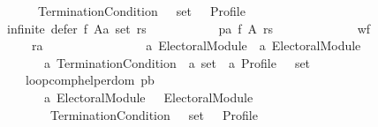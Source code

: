 \begin{isabellebody}
\ \ \ \ \ \ \ \ \ \ \ \ \ \ {\isacharparenleft}{\kern0pt}{\isacharunderscore}{\kern0pt}\ Termination{\isacharunderscore}{\kern0pt}Condition{\isacharparenright}{\kern0pt}\ {\isasymtimes}\ {\isacharunderscore}{\kern0pt}\ set\ {\isasymtimes}\ {\isacharunderscore}{\kern0pt}\ Profile{\isacharparenright}{\kern0pt}\ {\isasymor}\isanewline
\ \ \ \ \ \ \ \ \ \ infinite\ {\isacharparenleft}{\kern0pt}defer\ f\ {\isacharparenleft}{\kern0pt}A{\isacharcolon}{\kern0pt}{\isacharcolon}{\kern0pt}{\isacharprime}{\kern0pt}a\ set{\isacharparenright}{\kern0pt}\ rs{\isacharparenright}{\kern0pt}\ {\isasymor}\isanewline
\ \ \ \ \ \ \ \ \ \ pa\ {\isacharparenleft}{\kern0pt}f\ A\ rs{\isacharparenright}{\kern0pt}\ {\isasymand}\isanewline
\ \ \ \ \ \ \ \ \ \ \ \ wf\isanewline
\ \ \ \ \ \ \ \ \ \ \ \ \ \ {\isacharparenleft}{\kern0pt}ra{\isacharcolon}{\kern0pt}{\isacharcolon}{\kern0pt}{\isacharparenleft}{\kern0pt}{\isacharparenleft}{\kern0pt}\isanewline
\ \ \ \ \ \ \ \ \ \ \ \ \ \ \ \ {\isacharparenleft}{\kern0pt}{\isacharprime}{\kern0pt}a\ Electoral{\isacharunderscore}{\kern0pt}Module{\isacharparenright}{\kern0pt}\ {\isasymtimes}\ {\isacharparenleft}{\kern0pt}{\isacharprime}{\kern0pt}a\ Electoral{\isacharunderscore}{\kern0pt}Module{\isacharparenright}{\kern0pt}\ {\isasymtimes}\isanewline
\ \ \ \ \ \ \ \ \ \ \ \ \ \ \ \ {\isacharparenleft}{\kern0pt}{\isacharprime}{\kern0pt}a\ Termination{\isacharunderscore}{\kern0pt}Condition{\isacharparenright}{\kern0pt}\ {\isasymtimes}\ {\isacharprime}{\kern0pt}a\ set\ {\isasymtimes}\ {\isacharprime}{\kern0pt}a\ Profile{\isacharparenright}{\kern0pt}\ {\isasymtimes}\ {\isacharunderscore}{\kern0pt}{\isacharparenright}{\kern0pt}\ set{\isacharparenright}{\kern0pt}\ {\isasymand}\isanewline
\ \ \ \ \ \ \ \ \ \ \ \ {\isasymnot}\ loop{\isacharunderscore}{\kern0pt}comp{\isacharunderscore}{\kern0pt}helper{\isacharunderscore}{\kern0pt}dom\ {\isacharparenleft}{\kern0pt}pb{\isacharcolon}{\kern0pt}{\isacharcolon}{\kern0pt}\isanewline
\ \ \ \ \ \ \ \ \ \ \ \ \ \ \ \ {\isacharparenleft}{\kern0pt}{\isacharprime}{\kern0pt}a\ Electoral{\isacharunderscore}{\kern0pt}Module{\isacharparenright}{\kern0pt}\ {\isasymtimes}\ {\isacharparenleft}{\kern0pt}{\isacharunderscore}{\kern0pt}\ Electoral{\isacharunderscore}{\kern0pt}Module{\isacharparenright}{\kern0pt}\ {\isasymtimes}\isanewline
\ \ \ \ \ \ \ \ \ \ \ \ \ \ \ \ {\isacharparenleft}{\kern0pt}{\isacharunderscore}{\kern0pt}\ Termination{\isacharunderscore}{\kern0pt}Condition{\isacharparenright}{\kern0pt}\ {\isasymtimes}\ {\isacharunderscore}{\kern0pt}\ set\ {\isasymtimes}\ {\isacharunderscore}{\kern0pt}\ Profile{\isacharparenright}{\kern0pt}\ {\isasymor}\isanewline

\end{isabellebody}
